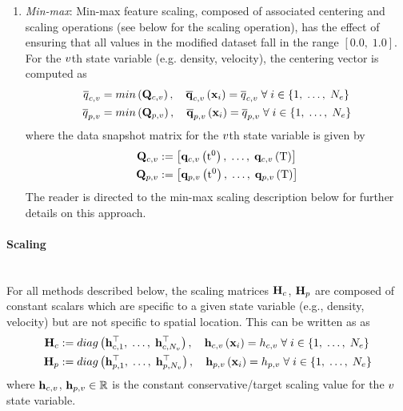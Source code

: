 \begin{enumerate}
	\item \textit{Min-max}: Min-max feature scaling, composed of associated centering and scaling operations (see below for the scaling operation), has the effect of ensuring that all values in the modified dataset fall in the range $[0.0, \; 1.0]$. For the $v$th state variable (e.g. density, velocity), the centering vector is computed as
	\begin{align}
		\consValCentVar &= min\left(\consDataMatVar\right), \quad \consVecCentVar\left(\spatialVec_{\dummyIdx}\right) = \consValCentVar \; \forall \; \dummyIdx \in \{1, \; \hdots, \; \numCells\} \\
		\primValCentVar &= min\left(\primDataMatVar\right), \quad \primVecCentVar\left(\spatialVec_{\dummyIdx}\right) = \primValCentVar \; \forall \; \dummyIdx \in \{1, \; \hdots, \; \numCells\}
	\end{align}
	where the data snapshot matrix for the $v$th state variable is given by
	\begin{align}
		\consDataMatVar &\defEq \left[ \consVecVar\left(\initTime\right), \; \hdots, \; \consVecVar\left(\finalTime\right) \right] \label{eq:consDataMat}\\
		\primDataMatVar &\defEq \left[ \primVecVar\left(\initTime\right), \; \hdots, \; \primVecVar\left(\finalTime\right) \right] \label{eq:primDataMat}
	\end{align}
	The reader is directed to the min-max scaling description below for further details on this approach.
\end{enumerate}

\paragraph*{Scaling}\mbox{}\\
%
For all methods described below, the scaling matrices $\consScale$, $\primScale$ are composed of constant scalars which are specific to a given state variable (e.g., density, velocity) but are not specific to spatial location. This can be written as as
%
\begin{align}
	\consScale &\defEq diag\left(\consScaleVecVar{1}^\top, \; \hdots, \; \consScaleVecVar{\numVars}^\top \right), \quad \consScaleVecVar{\varIdx}\left(\spatialVec_{\dummyIdx}\right) = \consScaleVar{\varIdx} \; \forall \; \dummyIdx \in \{1, \; \hdots, \; \numCells\} \\
	\primScale &\defEq diag\left(\primScaleVecVar{1}^\top, \; \hdots, \; \primScaleVecVar{\numVars}^\top \right), \quad \primScaleVecVar{\varIdx}\left(\spatialVec_{\dummyIdx}\right) = \primScaleVar{\varIdx} \; \forall \; \dummyIdx \in \{1, \; \hdots, \; \numCells\}
\end{align}
%
where $\mathbf{h}_{c,v}$, $\mathbf{h}_{p,v} \in \mathbb{R}$ is the constant conservative/target scaling value for the $v$ state variable.

